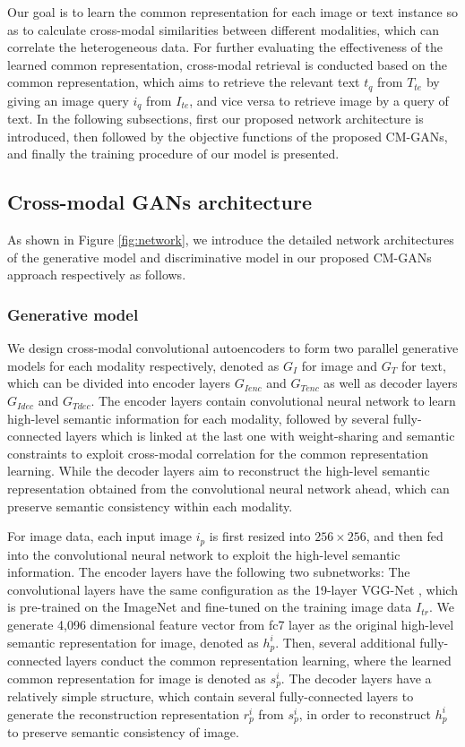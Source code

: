 \documentclass[journal]{IEEEtran}
\begin{document}
Our goal is to learn the common representation for each image or text instance so as to calculate cross-modal similarities between different modalities, which can correlate the heterogeneous data. For further evaluating the effectiveness of the learned common representation, cross-modal retrieval is conducted based on the common representation, which aims to retrieve the relevant text $t_q$ from $T_{te}$ by giving an image query $i_q$ from $I_{te}$, and vice versa to retrieve image by a query of text. In the following subsections, first our proposed network architecture is introduced, then followed by the objective functions of the proposed CM-GANs, and finally the training procedure of our model is presented.

\subsection{Cross-modal GANs architecture}

As shown in Figure \ref{fig:network}, we introduce the detailed network architectures of the generative model and discriminative model in our proposed CM-GANs approach respectively as follows.

\subsubsection{\textbf{Generative model}} We design cross-modal convolutional autoencoders to form two parallel generative models for each modality respectively, denoted as $G_I$ for image and $G_T$ for text, which can be divided into encoder layers $G_{Ienc}$ and $G_{Tenc}$ as well as decoder layers $G_{Idec}$ and $G_{Tdec}$.
The encoder layers contain convolutional neural network to learn high-level semantic information for each modality, followed by several fully-connected layers which is linked at the last one with weight-sharing and semantic constraints to exploit cross-modal correlation for the common representation learning. While the decoder layers aim to reconstruct the high-level semantic representation obtained from the convolutional neural network ahead, which can preserve semantic consistency within each modality.

For image data, each input image $i_p$ is first resized into $256\times 256$, and then fed into the convolutional neural network to exploit the high-level semantic information. The encoder layers have the following two subnetworks: The convolutional layers have the same configuration as the 19-layer VGG-Net \cite{DBLP:journals/corr/SimonyanZ14a}, which is pre-trained on the ImageNet and fine-tuned on the training image data $I_{tr}$. We generate 4,096 dimensional feature vector from fc7 layer as the original high-level semantic representation for image, denoted as $h_p^i$. Then, several additional fully-connected layers conduct the common representation learning, where the learned common representation for image is denoted as $s_p^i$. The decoder layers have a relatively simple structure, which contain several fully-connected layers to generate the reconstruction representation $r_p^i$ from $s_p^i$, in order to reconstruct $h_p^i$ to preserve semantic consistency of image.
\end{document}
